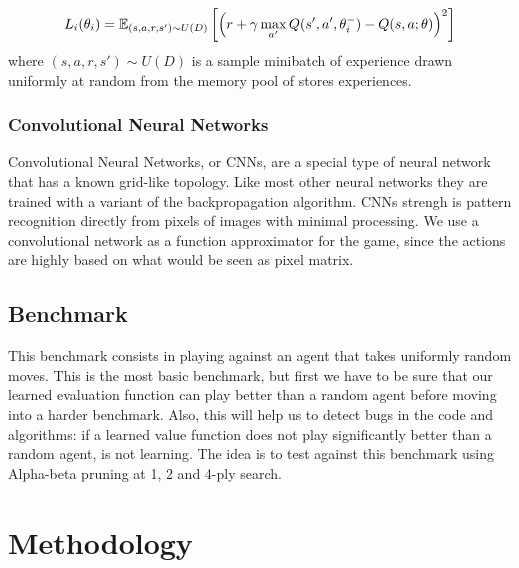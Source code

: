 \documentclass[a4paper]{article}
\begin{document}
\begin{equation}
L_i(\theta_i) = \mathbb{E}_{(s, a, r, s') \sim U(D)} \\
                \left[\left(r + \gamma \max_{a'} Q(s',a', \theta^-_i) - Q(s,a;\theta)\right)^2\right]
\end{equation}
where $(s, a, r, s') \sim U(D)$ is a sample minibatch of experience drawn uniformly at random from the memory pool of stores experiences.

\subsubsection{Convolutional Neural Networks}

Convolutional Neural Networks, or CNNs, are a special type of neural network that has a known grid-like topology. Like most other neural networks they are trained with a variant of the backpropagation algorithm. CNNs strengh is pattern recognition directly from pixels of images with minimal processing. We use a convolutional network as a function approximator for the game, since the actions are highly based on what would be seen as pixel matrix.

\subsection{Benchmark}

This benchmark consists in playing against an agent that takes uniformly random moves. This is the most basic benchmark, but first we have to be sure that our learned evaluation function can play better than a random agent before moving into a harder benchmark. Also, this will help us to detect bugs in the code and algorithms: if a learned value function does not play significantly better than a random agent, is not learning. The idea is to test against this benchmark using Alpha-beta pruning at 1, 2 and 4-ply search.


\section{Methodology}
\end{document}
